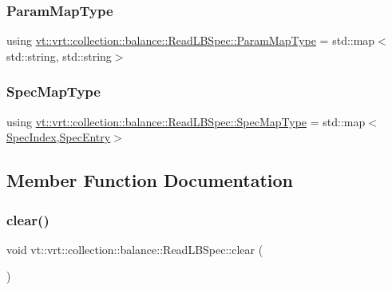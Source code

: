 \subsubsection{\texorpdfstring{Param\+Map\+Type}{ParamMapType}}
{\footnotesize\ttfamily using \hyperlink{structvt_1_1vrt_1_1collection_1_1balance_1_1_read_l_b_spec_a05e30b32f0ca5df2cb160514fa0eeb41}{vt\+::vrt\+::collection\+::balance\+::\+Read\+L\+B\+Spec\+::\+Param\+Map\+Type} =  std\+::map$<$std\+::string, std\+::string$>$}

\mbox{\label{structvt_1_1vrt_1_1collection_1_1balance_1_1_read_l_b_spec_aa73c3611c615832402eeeed6fb7b8049}} 
\subsubsection{\texorpdfstring{Spec\+Map\+Type}{SpecMapType}}
{\footnotesize\ttfamily using \hyperlink{structvt_1_1vrt_1_1collection_1_1balance_1_1_read_l_b_spec_aa73c3611c615832402eeeed6fb7b8049}{vt\+::vrt\+::collection\+::balance\+::\+Read\+L\+B\+Spec\+::\+Spec\+Map\+Type} =  std\+::map$<$\hyperlink{namespacevt_1_1vrt_1_1collection_1_1balance_a72a5e0d9936ddf57f8e6c64e0e9fd123}{Spec\+Index},\hyperlink{structvt_1_1vrt_1_1collection_1_1balance_1_1_spec_entry}{Spec\+Entry}$>$}



\subsection{Member Function Documentation}
\mbox{\label{structvt_1_1vrt_1_1collection_1_1balance_1_1_read_l_b_spec_aa92db6434f6eb0839312f914139d296c}} 
\subsubsection{\texorpdfstring{clear()}{clear()}}
{\footnotesize\ttfamily void vt\+::vrt\+::collection\+::balance\+::\+Read\+L\+B\+Spec\+::clear (\begin{DoxyParamCaption}{ }\end{DoxyParamCaption})\hspace{0.3cm}{\ttfamily [static]}}

